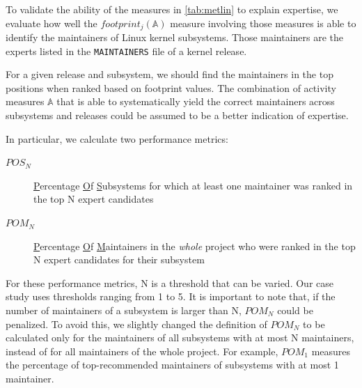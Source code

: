 
To validate the ability of the measures in \autoref{tab:metlin} to explain expertise, we evaluate how well the $footprint_j(\mathbb{A})$ measure involving those measures is able to identify the maintainers of Linux kernel subsystems. Those maintainers are the experts listed in the \texttt{MAINTAINERS} file of a kernel release.

For a given release and subsystem, %
we should find the maintainers in the top positions when ranked based on footprint values. The combination of activity measures $\mathbb{A}$ that is able to systematically yield the correct maintainers across subsystems and releases could be assumed to be a better indication of expertise. 

In particular, we calculate two performance metrics:
\begin{description}
\item[$POS_N$] \underline{P}ercentage \underline{O}f \underline{S}ubsystems for which at least one maintainer was ranked in the top N expert candidates
\item[$POM_N$] \underline{P}ercentage \underline{O}f \underline{M}aintainers in the {\em whole} project who were ranked in the top N expert candidates for their subsystem
\end{description}

For these performance metrics, N is a threshold that can be varied. Our case study uses thresholds ranging from 1 to 5. It is important to note that, if the number of maintainers of a subsystem is larger than N, $POM_N$ could be penalized. To avoid this, we slightly changed the definition of $POM_N$ to be calculated only for the maintainers of all subsystems with at most N maintainers, instead of for all maintainers of the whole project. For example, $POM_1$ measures the percentage of top-recommended maintainers of subsystems with at most 1 maintainer.%

